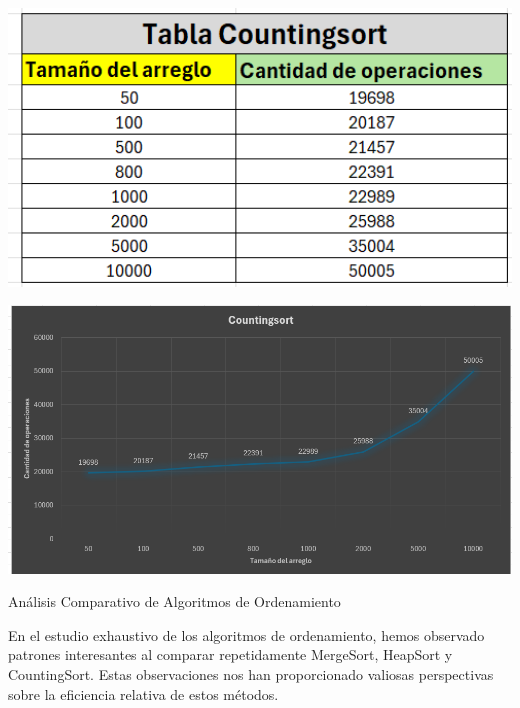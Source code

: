 \documentclass[12pt]{article}
\begin{document}
\par\vspace{0.4cm}
\includegraphics[width=15cm]{Images/Tab_CS.png}
\par\vspace{0.4cm}
\includegraphics[width=15cm]{Images/Graf_CS.png}
\par\vspace{0.4cm}
Análisis Comparativo de Algoritmos de Ordenamiento
\par\vspace{0.4cm}
En el estudio exhaustivo de los algoritmos de ordenamiento, hemos observado patrones interesantes al comparar repetidamente MergeSort, HeapSort y CountingSort. Estas observaciones nos han proporcionado valiosas perspectivas sobre la eficiencia relativa de estos métodos.
\par\vspace{0.4cm}
\end{document}
